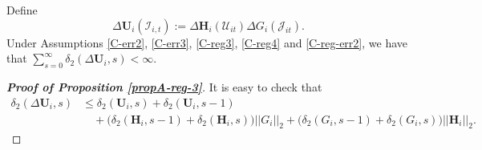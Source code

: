 \documentclass[a4paper,12pt]{article}
\begin{document}
\begin{propA}\label{propA-reg-3}
Define 
\[ \Delta \mathbf{U}_i(\mathcal{I}_{i, t}) := \Delta \mathbf{H}_i(\mathcal{U}_{it}) \Delta G_i(\mathcal{J}_{it}).
\]
Under Assumptions \ref{C-err2}, \ref{C-err3}, \ref{C-reg3}, \ref{C-reg4} and \ref{C-reg-err2}, we have that $\sum_{s=0}^\infty \delta_2(\Delta \mathbf{U}_i, s) < \infty$.
\end{propA}

\begin{proof}[\textnormal{\textbf{Proof of Proposition \ref{propA-reg-3}}}]
It is easy to check that
\begin{align*}
 \delta_2(\Delta \mathbf{U}_i, s) &\leq \delta_2(\mathbf{U}_i, s) + \delta_2(\mathbf{U}_i, s-1)  \\
&\quad + \big(\delta_2(\mathbf{H}_i, s-1) +  \delta_2(\mathbf{H}_i, s)\big) ||G_i ||_2 + \big( \delta_2(G_i, s-1) +  \delta_2(G_i, s)\big)||\mathbf{H}_i ||_2.
\end{align*}


\end{proof}
\end{document}

